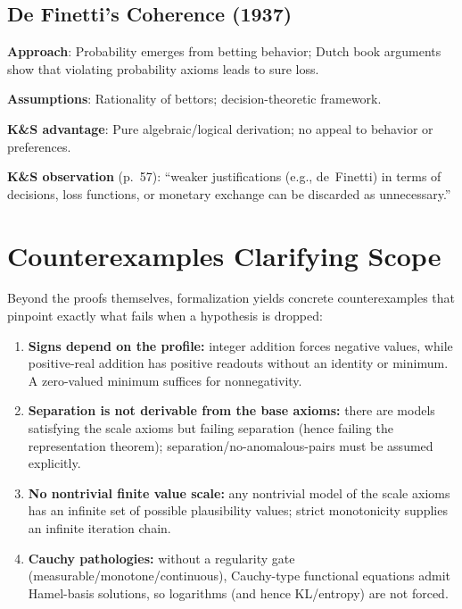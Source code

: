 \documentclass[11pt]{article}
\begin{document}
\subsection{De Finetti's Coherence (1937)}

\textbf{Approach}: Probability emerges from betting behavior; Dutch book arguments
show that violating probability axioms leads to sure loss.

\textbf{Assumptions}: Rationality of bettors; decision-theoretic framework.

\textbf{K\&S advantage}: Pure algebraic/logical derivation; no appeal to behavior or preferences.

\textbf{K\&S observation} (p.~57): ``weaker justifications (e.g., de~Finetti) in terms
of decisions, loss functions, or monetary exchange can be discarded as unnecessary.''

\newpage
\section{Counterexamples Clarifying Scope}

Beyond the proofs themselves, formalization yields concrete counterexamples that pinpoint exactly what
fails when a hypothesis is dropped:
\begin{enumerate}
\item \textbf{Signs depend on the profile:} integer addition forces negative values, while positive-real addition
has positive readouts without an identity or minimum. A zero-valued minimum suffices for nonnegativity.
\item \textbf{Separation is not derivable from the base axioms:} there are models satisfying the scale axioms
but failing separation (hence failing the representation theorem); separation/no-anomalous-pairs must be
assumed explicitly.
\item \textbf{No nontrivial finite value scale:} any nontrivial model of the scale axioms has an infinite set of
possible plausibility values; strict monotonicity supplies an infinite iteration chain.
\item \textbf{Cauchy pathologies:} without a regularity gate (measurable/monotone/continuous), Cauchy-type
functional equations admit Hamel-basis solutions, so logarithms (and hence KL/entropy) are not forced.
\end{enumerate}
\end{document}
